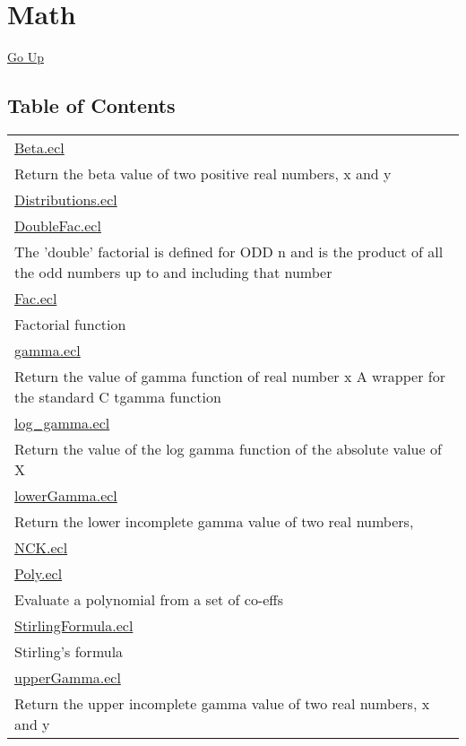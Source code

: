 \chapter*{\color{headtoc} Math}
\hypertarget{ecldoc:toc:root/ML_Core/Math}{}
\hyperlink{ecldoc:toc:root/ML_Core}{Go Up}


\section*{Table of Contents}
{\renewcommand{\arraystretch}{1.5}
\begin{longtable}{|p{\textwidth}|}
\hline
\hyperlink{ecldoc:toc:ML_Core.Math.Beta}{Beta.ecl} \\
Return the beta value of two positive real numbers, x and y \\
\hline
\hyperlink{ecldoc:toc:ML_Core.Math.Distributions}{Distributions.ecl} \\
\hline
\hyperlink{ecldoc:toc:ML_Core.Math.DoubleFac}{DoubleFac.ecl} \\
The 'double' factorial is defined for ODD n and is the product of all the odd numbers up to and including that number \\
\hline
\hyperlink{ecldoc:toc:ML_Core.Math.Fac}{Fac.ecl} \\
Factorial function \\
\hline
\hyperlink{ecldoc:toc:ML_Core.Math.gamma}{gamma.ecl} \\
Return the value of gamma function of real number x A wrapper for the standard C tgamma function \\
\hline
\hyperlink{ecldoc:toc:ML_Core.Math.log_gamma}{log\_gamma.ecl} \\
Return the value of the log gamma function of the absolute value of X \\
\hline
\hyperlink{ecldoc:toc:ML_Core.Math.lowerGamma}{lowerGamma.ecl} \\
Return the lower incomplete gamma value of two real numbers, \\
\hline
\hyperlink{ecldoc:toc:ML_Core.Math.NCK}{NCK.ecl} \\
\hline
\hyperlink{ecldoc:toc:ML_Core.Math.Poly}{Poly.ecl} \\
Evaluate a polynomial from a set of co-effs \\
\hline
\hyperlink{ecldoc:toc:ML_Core.Math.StirlingFormula}{StirlingFormula.ecl} \\
Stirling's formula \\
\hline
\hyperlink{ecldoc:toc:ML_Core.Math.upperGamma}{upperGamma.ecl} \\
Return the upper incomplete gamma value of two real numbers, x and y \\
\hline
\end{longtable}
}












